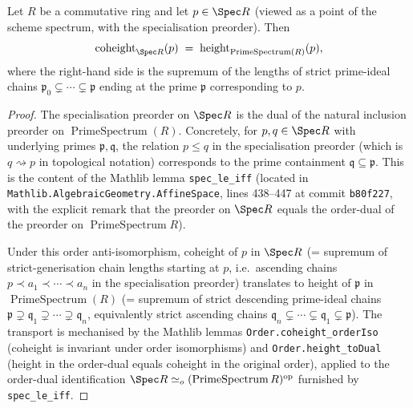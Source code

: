 
\begin{lemma}\leanok
  \label{lem:coheight_spec_eq_height_primeSpectrum}
  Let \(R\) be a commutative ring and let \(p \in \Spec R\) (viewed as a point of
  the scheme spectrum, with the specialisation preorder). Then
  \[
    \operatorname{coheight}_{\Spec R}(p) \;=\; \operatorname{height}_{\operatorname{PrimeSpectrum}(R)}(p),
  \]
  where the right-hand side is the supremum of the lengths of strict
  prime-ideal chains \(\mathfrak{p}_0 \subsetneq \cdots \subsetneq \mathfrak{p}\)
  ending at the prime \(\mathfrak{p}\) corresponding to \(p\).
\end{lemma}

\begin{proof}

\leanok
  The specialisation preorder on \(\Spec R\) is the dual of the natural
  inclusion preorder on \(\operatorname{PrimeSpectrum}(R)\). Concretely, for
  \(p, q \in \Spec R\) with underlying primes \(\mathfrak{p}, \mathfrak{q}\),
  the relation \(p \leq q\) in the specialisation preorder (which is
  \(q \rightsquigarrow p\) in topological notation) corresponds to the prime
  containment \(\mathfrak{q} \subseteq \mathfrak{p}\). This is the content of
  the Mathlib lemma \texttt{spec\_le\_iff} (located in
  \texttt{Mathlib.AlgebraicGeometry.AffineSpace}, lines 438--447 at commit
  \texttt{b80f227}, with the explicit remark that the preorder on \(\Spec R\)
  equals the order-dual of the preorder on \(\operatorname{PrimeSpectrum} R\)).

  Under this order anti-isomorphism, coheight of \(p\) in \(\Spec R\)
  (= supremum of strict-generisation chain lengths starting at \(p\),
  i.e.\ ascending chains \(p \prec a_1 \prec \cdots \prec a_n\) in the
  specialisation preorder) translates to height of \(\mathfrak{p}\) in
  \(\operatorname{PrimeSpectrum}(R)\) (= supremum of strict descending prime-ideal
  chains \(\mathfrak{p} \supsetneq \mathfrak{q}_1 \supsetneq \cdots \supsetneq
  \mathfrak{q}_n\), equivalently strict ascending chains
  \(\mathfrak{q}_n \subsetneq \cdots \subsetneq \mathfrak{q}_1 \subsetneq
  \mathfrak{p}\)). The transport is mechanised by the Mathlib lemmas
  \texttt{Order.coheight\_orderIso} (coheight is invariant under order
  isomorphisms) and \texttt{Order.height\_toDual} (height in the order-dual
  equals coheight in the original order), applied to the order-dual
  identification \(\Spec R \simeq_o (\operatorname{PrimeSpectrum} R)^{\operatorname{op}}\)
  furnished by \texttt{spec\_le\_iff}.
\end{proof}

